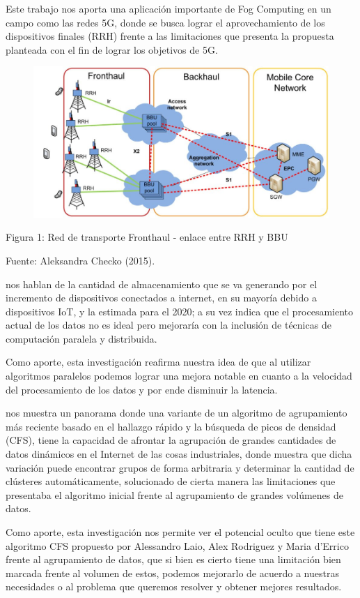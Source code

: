         Este trabajo nos aporta una aplicación importante de Fog Computing en un campo como las redes 5G, donde se busca lograr el aprovechamiento de los dispositivos finales (RRH) frente a las limitaciones que presenta la propuesta planteada con el fin de lograr los objetivos de 5G.\par     
        \begin{figure}[ht]
            \begin{center}
                \includegraphics[width=.8\textwidth]{redFronthaul}
            \end{center}
        \end{figure}
        \begin{center}
            { Figura 1: Red de transporte Fronthaul - enlace entre RRH y BBU }\par 
            { Fuente: Aleksandra Checko (2015). }
        \end{center}   
        \vskip 0.3cm
        {\bf\cite{piccialli2018}} nos hablan de la cantidad de almacenamiento que se va generando por el incremento de dispositivos conectados a internet, en su mayoría debido a dispositivos IoT, y la estimada para el 2020; a su vez indica que el procesamiento actual de los datos no es ideal pero mejoraría con la inclusión de técnicas de computación paralela y distribuida.\par
        Como aporte, esta investigación reafirma nuestra idea de que al utilizar algoritmos paralelos podemos lograr una mejora notable en cuanto a la velocidad del procesamiento de los datos y por ende disminuir la latencia. \par
        \vskip 0.3cm
        {\bf\cite{shanmugapriya2018}} nos muestra un panorama donde una variante de un algoritmo de agrupamiento más reciente basado en el hallazgo rápido y la búsqueda de picos de densidad (CFS), tiene la capacidad de afrontar la agrupación de grandes cantidades de datos dinámicos en el Internet de las cosas industriales, donde muestra que dicha variación puede encontrar grupos de forma arbitraria y determinar la cantidad de clústeres automáticamente, solucionado de cierta manera las limitaciones que presentaba el algoritmo inicial frente al agrupamiento de grandes volúmenes de datos.\par
        Como aporte, esta investigación nos permite ver el potencial oculto que tiene este algoritmo CFS propuesto por Alessandro Laio, Alex Rodriguez y Maria d’Errico frente al agrupamiento de datos, que si bien es cierto tiene una limitación bien marcada frente al volumen de estos, podemos mejorarlo de acuerdo a nuestras necesidades o al problema que queremos resolver y obtener mejores resultados.\par

